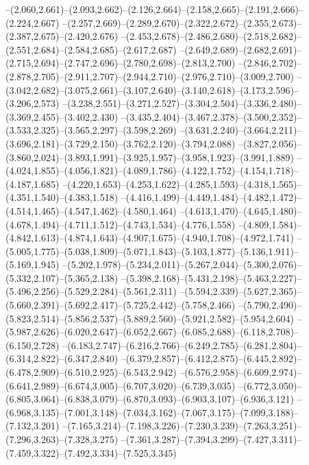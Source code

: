   --(2.060,2.661)--(2.093,2.662)--(2.126,2.664)--(2.158,2.665)--(2.191,2.666)--(2.224,2.667)%
  --(2.257,2.669)--(2.289,2.670)--(2.322,2.672)--(2.355,2.673)--(2.387,2.675)--(2.420,2.676)%
  --(2.453,2.678)--(2.486,2.680)--(2.518,2.682)--(2.551,2.684)--(2.584,2.685)--(2.617,2.687)%
  --(2.649,2.689)--(2.682,2.691)--(2.715,2.694)--(2.747,2.696)--(2.780,2.698)--(2.813,2.700)%
  --(2.846,2.702)--(2.878,2.705)--(2.911,2.707)--(2.944,2.710)--(2.976,2.710)--(3.009,2.700)%
  --(3.042,2.682)--(3.075,2.661)--(3.107,2.640)--(3.140,2.618)--(3.173,2.596)--(3.206,2.573)%
  --(3.238,2.551)--(3.271,2.527)--(3.304,2.504)--(3.336,2.480)--(3.369,2.455)--(3.402,2.430)%
  --(3.435,2.404)--(3.467,2.378)--(3.500,2.352)--(3.533,2.325)--(3.565,2.297)--(3.598,2.269)%
  --(3.631,2.240)--(3.664,2.211)--(3.696,2.181)--(3.729,2.150)--(3.762,2.120)--(3.794,2.088)%
  --(3.827,2.056)--(3.860,2.024)--(3.893,1.991)--(3.925,1.957)--(3.958,1.923)--(3.991,1.889)%
  --(4.024,1.855)--(4.056,1.821)--(4.089,1.786)--(4.122,1.752)--(4.154,1.718)--(4.187,1.685)%
  --(4.220,1.653)--(4.253,1.622)--(4.285,1.593)--(4.318,1.565)--(4.351,1.540)--(4.383,1.518)%
  --(4.416,1.499)--(4.449,1.484)--(4.482,1.472)--(4.514,1.465)--(4.547,1.462)--(4.580,1.464)%
  --(4.613,1.470)--(4.645,1.480)--(4.678,1.494)--(4.711,1.512)--(4.743,1.534)--(4.776,1.558)%
  --(4.809,1.584)--(4.842,1.613)--(4.874,1.643)--(4.907,1.675)--(4.940,1.708)--(4.972,1.741)%
  --(5.005,1.775)--(5.038,1.809)--(5.071,1.843)--(5.103,1.877)--(5.136,1.911)--(5.169,1.945)%
  --(5.202,1.978)--(5.234,2.011)--(5.267,2.044)--(5.300,2.076)--(5.332,2.107)--(5.365,2.138)%
  --(5.398,2.168)--(5.431,2.198)--(5.463,2.227)--(5.496,2.256)--(5.529,2.284)--(5.561,2.311)%
  --(5.594,2.339)--(5.627,2.365)--(5.660,2.391)--(5.692,2.417)--(5.725,2.442)--(5.758,2.466)%
  --(5.790,2.490)--(5.823,2.514)--(5.856,2.537)--(5.889,2.560)--(5.921,2.582)--(5.954,2.604)%
  --(5.987,2.626)--(6.020,2.647)--(6.052,2.667)--(6.085,2.688)--(6.118,2.708)--(6.150,2.728)%
  --(6.183,2.747)--(6.216,2.766)--(6.249,2.785)--(6.281,2.804)--(6.314,2.822)--(6.347,2.840)%
  --(6.379,2.857)--(6.412,2.875)--(6.445,2.892)--(6.478,2.909)--(6.510,2.925)--(6.543,2.942)%
  --(6.576,2.958)--(6.609,2.974)--(6.641,2.989)--(6.674,3.005)--(6.707,3.020)--(6.739,3.035)%
  --(6.772,3.050)--(6.805,3.064)--(6.838,3.079)--(6.870,3.093)--(6.903,3.107)--(6.936,3.121)%
  --(6.968,3.135)--(7.001,3.148)--(7.034,3.162)--(7.067,3.175)--(7.099,3.188)--(7.132,3.201)%
  --(7.165,3.214)--(7.198,3.226)--(7.230,3.239)--(7.263,3.251)--(7.296,3.263)--(7.328,3.275)%
  --(7.361,3.287)--(7.394,3.299)--(7.427,3.311)--(7.459,3.322)--(7.492,3.334)--(7.525,3.345)%
